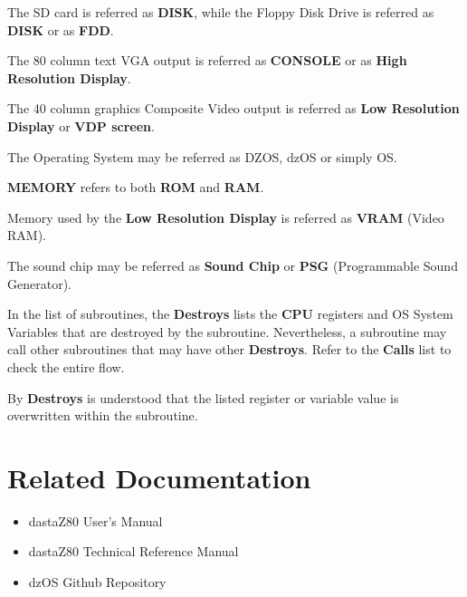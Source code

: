 \documentclass[a4paper,11pt]{article}
\begin{document}
    The SD card is referred as \textbf{DISK}, while the Floppy Disk Drive is
    referred as \textbf{DISK} or as \textbf{FDD}.

    The 80 column text VGA output is referred as \textbf{CONSOLE} or as
    \textbf{High Resolution Display}.

    The 40 column graphics Composite Video output is referred as \textbf{Low
    Resolution Display} or \textbf{VDP screen}.

    The Operating System may be referred as DZOS, dzOS or simply OS.

    \textbf{MEMORY} refers to both \textbf{ROM} and \textbf{RAM}.

    Memory used by the \textbf{Low Resolution Display} is referred as
    \textbf{VRAM} (Video RAM).

    The sound chip may be referred as \textbf{Sound Chip} or \textbf{PSG}
    (Programmable Sound Generator).

    In the list of subroutines, the \textbf{Destroys} lists the \textbf{CPU}
    registers and OS System Variables that are destroyed by the subroutine.
    Nevertheless, a subroutine may call other subroutines that may have other
    \textbf{Destroys}. Refer to the \textbf{Calls} list to check the entire
    flow. 
    
    By \textbf{Destroys} is understood that the listed register or variable
    value is overwritten within the subroutine.

    \pagebreak
    \section*{Related Documentation}
    \begin{itemize}
        \item dastaZ80 User's Manual\cite{dastaz80userman}
        \item dastaZ80 Technical Reference Manual\cite{dastaz80techman}
        \item dzOS Github Repository\cite{dastaZ80github}
    \end{itemize}

    \pagebreak
    \tableofcontents
\end{document}
